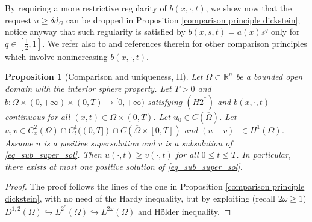 \documentclass[11pt, reqno]{amsart}
\newtheorem{proposition}[lemma]{Proposition}
\theoremstyle{definition}
\numberwithin{equation}{section}
\newcommand{\Omegabar}{\overline{\Omega}}
\newcommand{\R}{\mathbb{R}}
\begin{document}
By requiring a more restrictive regularity of $b(x,\cdot,t)$, we show now that the request $u \geq \delta d_{\Omega}$ can be dropped in Proposition \ref{comparison principle dickstein}; notice anyway that such regularity is satisfied by $b(x,s,t)=a(x) s^q$ only for $q \in [\frac{1}{2},1]$.
We refer also to \cite[Section A.1]{ILS20} and references therein for other comparison principles which involve nonincreasing $b(x,\cdot,t)$. 
\begin{proposition}[Comparison and uniqueness, II]
\label{comparison principle dickstein_2} 
Let $\Omega \subset \R^n$ be a bounded open domain with the interior sphere property. Let $T>0$ and $b\colon\Omega\times(0,+\infty) \times (0,T)\to [0,+\infty)$ satisfying \hyperlink{H2*}{\( (H2^*) \)} and $b(x,\cdot,t)$ continuous for all $(x,t)\in \Omega\times(0,T)$.
	Let $u_0\in C(\Omegabar)$. Let $u,v\in C^2_x(\Omega)\cap C^1_t((0,T])\cap C(\Omegabar\times[0,T])$ and $(u-v)^+\in H^1(\Omega)$.
	Assume $u$ is a positive supersolution and $v$ is a subsolution of \eqref{eq_sub_super_sol}.
Then $u(\cdot,t)\geq v(\cdot,t)$ for all $0\leq t\leq T$. 
In particular, there exists at most one positive solution of \eqref{eq_sub_super_sol}.
\end{proposition}

\begin{proof}
The proof follows the lines of the one in Proposition \ref{comparison principle dickstein}, with no need of the Hardy inequality, but by exploiting (recall $2\omega \geq 1$) $D^{1,2}(\Omega) \hookrightarrow L^{2^*}(\Omega) \hookrightarrow L^{2\omega}(\Omega)$ and Hölder inequality.
\end{proof}
\end{document}
